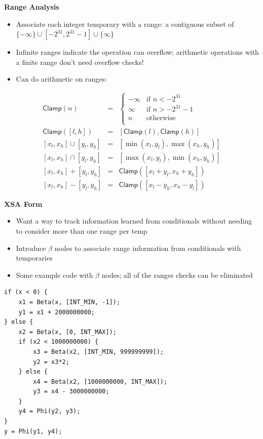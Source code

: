 \documentclass{slides}
\newcommand{\Clamp}{\mathsf{Clamp}}
\begin{document}
\begin{slide}
\begin{center}
{\Huge \bf{Range Analysis}}
\end{center}
\begin{itemize}
\item Associate each integer temporary with a range: a contiguous subset of $\{-\infty\} \cup [-2^{31}, 2^{31}-1] \cup \{\infty\}$
\item Infinite ranges indicate the operation can overflow; arithmetic operations with a finite range don't need overflow checks!
\item Can do arithmetic on ranges:
\end{itemize}
\begin{eqnarray*}
\Clamp(n) &=& \begin{cases}
-\infty &\text{if } n < -2^{31} \\
\infty &\text{if } n > -2^{31}-1 \\
n&\text{otherwise } \\
\end{cases}\\
\Clamp([l, h]) &=& [\Clamp(l), \Clamp(h)] \\
{[x_l, x_h] \cup [y_l, y_h]} &=& [\min(x_l, y_l), \max(x_h, y_h)] \\
{[x_l, x_h] \cap [y_l, y_h]} &=& [\max(x_l, y_l), \min(x_h, y_h)] \\
{[x_l, x_h] + [y_l, y_h]} &=& \Clamp ([x_l + y_l, x_h + y_h]) \\
{[x_l, x_h] - [y_l, y_h]} &=& \Clamp ([x_l - y_h, x_h - y_l])
\end{eqnarray*}
\end{slide}


\begin{slide}
\begin{center}
{\Huge \bf{XSA Form}}
\end{center}
\begin{itemize}
\item Want a way to track information learned from conditionals without needing to consider more than one range per temp
\item Introduce $\beta$ nodes to associate range information from conditionals with temporaries
\item Some example code with $\beta$ nodes; all of the ranges checks can be eliminated
\end{itemize}
{\tiny
\begin{verbatim}
if (x < 0) {
    x1 = Beta(x, [INT_MIN, -1]);
    y1 = x1 + 2000000000;
} else {
    x2 = Beta(x, [0, INT_MAX]);
    if (x2 < 1000000000) {
        x3 = Beta(x2, [INT_MIN, 999999999]);
        y2 = x3*2;
    } else {
        x4 = Beta(x2, [1000000000, INT_MAX]);
        y3 = x4 - 3000000000;
    }
    y4 = Phi(y2, y3);
}
y = Phi(y1, y4);
\end{verbatim}
}
\end{slide}
\end{document}
